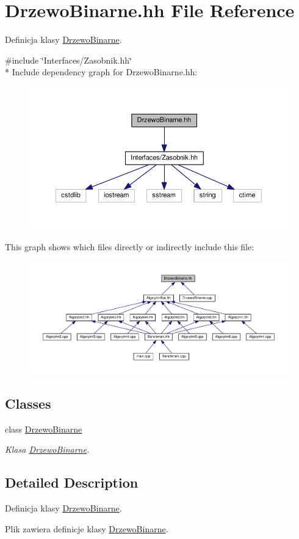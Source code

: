 \hypertarget{a00038}{}\section{Drzewo\+Binarne.\+hh File Reference}
\label{a00038}


Definicja klasy \hyperlink{a00010}{Drzewo\+Binarne}.  


{\ttfamily \#include \char`\"{}Interfaces/\+Zasobnik.\+hh\char`\"{}}\\*
Include dependency graph for Drzewo\+Binarne.\+hh\+:
\nopagebreak
\begin{figure}[H]
\begin{center}
\leavevmode
\includegraphics[width=350pt]{a00087}
\end{center}
\end{figure}
This graph shows which files directly or indirectly include this file\+:
\nopagebreak
\begin{figure}[H]
\begin{center}
\leavevmode
\includegraphics[width=350pt]{a00088}
\end{center}
\end{figure}
\subsection*{Classes}
\begin{DoxyCompactItemize}
\item 
class \hyperlink{a00010}{Drzewo\+Binarne}
\begin{DoxyCompactList}\small\item\em Klasa \hyperlink{a00010}{Drzewo\+Binarne}. \end{DoxyCompactList}\end{DoxyCompactItemize}


\subsection{Detailed Description}
Definicja klasy \hyperlink{a00010}{Drzewo\+Binarne}. 

Plik zawiera definicje klasy \hyperlink{a00010}{Drzewo\+Binarne}. 